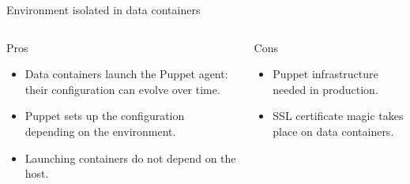 \documentclass[presentation,c]{beamer}
\begin{document}
{
\begin{frame}[label=sec-13-7]{Environment isolated in data containers}

\begin{columns}
\begin{column}{0.5\textwidth}
\begin{block}{Pros}

\begin{itemize}
\item Data containers launch the Puppet agent: their configuration can evolve over time.
\item Puppet sets up the configuration depending on the environment.
\item Launching containers do not depend on the host.
\end{itemize}
\end{block}
\end{column}

\begin{column}{0.5\textwidth}
\begin{block}{Cons}

\begin{itemize}
\item Puppet infrastructure needed in production.
\item SSL certificate magic takes place on data containers.
\end{itemize}
\end{block}
\end{column}
\end{columns}
\end{frame}
} %

\section{}
\label{sec-14}
{
\begin{frame}[label=sec-14-1]{}
\end{frame}
} %
\end{document}
